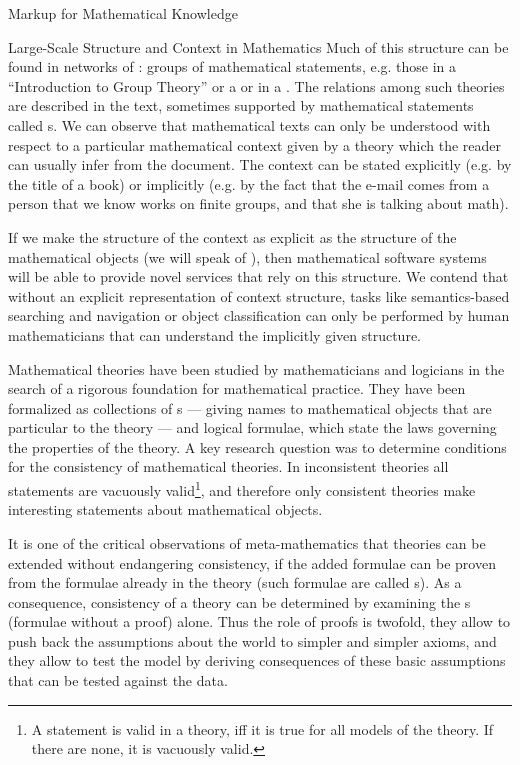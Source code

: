 \begin{tchapter}[id=math-markup]{Markup for Mathematical Knowledge}
\begin{tsection}[id=meta-theories]{Large-Scale Structure and Context in Mathematics}
  Much of this structure can be found in networks of {}: groups of mathematical statements, e.g. those
  in a  ``Introduction to Group Theory'' or a {} or
  {} in a {}. The relations among such theories are
  described in the text, sometimes supported by mathematical statements called
  {s}. We can observe that mathematical texts can only be
  understood with respect to a particular mathematical context given by a theory which the
  reader can usually infer from the document. The context can be stated explicitly
  (e.g. by the title of a book) or implicitly (e.g. by the fact that the e-mail comes from
  a person that we know works on finite groups, and that she is talking about math).

  If we make the structure of the context as explicit as the structure of the mathematical
  objects (we will speak of {}), then mathematical software
  systems will be able to provide novel services that rely on this structure. We contend
  that without an explicit representation of context structure, tasks like semantics-based
  searching and navigation or object classification can only be performed by human
  mathematicians that can understand the implicitly given structure.

Mathematical theories {} have been studied by mathematicians
and logicians in the search of a rigorous foundation for mathematical practice. They have
been formalized as collections of {s} --- giving names to
mathematical objects that are particular to the theory --- and logical formulae, which
state the laws governing the properties of the theory. A key research question was to
determine conditions for the consistency of mathematical theories. In inconsistent
theories all statements are vacuously valid\footnote{A statement is valid in a theory, iff
  it is true for all models of the theory. If there are none, it is vacuously valid.}, and
therefore only consistent theories make interesting statements about mathematical objects.

It is one of the critical observations of meta-mathematics that theories can be extended
without endangering consistency, if the added formulae can be proven from the formulae
already in the theory (such formulae are called {s}). As a consequence,
consistency of a theory can be determined by examining the {s} (formulae
without a proof) alone. Thus the role of proofs is twofold, they allow to push back the
assumptions about the world to simpler and simpler axioms, and they allow to test the
model by deriving consequences of these basic assumptions that can be tested against the
data.
  

\end{tsection}
\end{tchapter}
